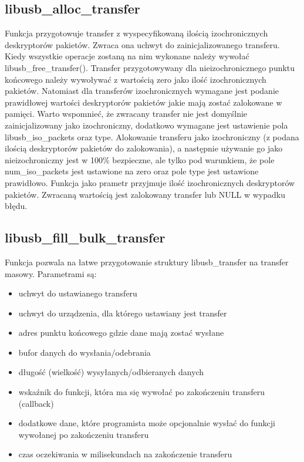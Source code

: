 \documentclass{BscUS}
\begin{document}
\subsection{libusb\_alloc\_transfer}
\noindent Funkcja przygotowuje transfer z wyspecyfikowaną ilością 	izochronicznych deskryptorów pakietów.
Zwraca ona uchwyt do zainicjalizowanego transferu. Kiedy wszystkie operacje zostaną na nim wykonane należy wywołać libusb\_free\_transfer().
Transfer przygotowywany dla nieizochronicznego punktu końcowego należy wywoływać z wartością zero jako ilość izochronicznych pakietów.
Natomiast dla transferów izochronicznych wymagane jest podanie prawidłowej wartości deskryptorów pakietów jakie mają zostać zalokowane w pamięci. Warto wspomnieć, że zwracany transfer nie jest domyślnie zainicjalizowany jako izochroniczny, dodatkowo wymagane jest ustawienie pola libusb\_iso\_packets oraz type.
Alokowanie transferu jako izochroniczny (z podana ilością deskryptorów pakietów do zalokowania), a następnie używanie go jako nieizochroniczny jest w 100\% bezpieczne, ale tylko pod warunkiem, że pole num\_iso\_packets jest ustawione na zero oraz pole type jest ustawione prawidłowo.
Funkcja jako prametr przyjmuje ilość izochronicznych deskryptorów pakietów.
Zwracaną wartością jest zalokowany transfer lub NULL w wypadku błędu.
\subsection{libusb\_fill\_bulk\_transfer}
\noindent Funkcja pozwala na łatwe przygotowanie struktury libusb\_transfer na transfer masowy.
\newline
Parametrami są:
\begin{itemize}
\item uchwyt do ustawianego transferu
\item uchwyt do urządzenia, dla którego ustawiany jest transfer
\item adres punktu końcowego gdzie dane mają zostać wysłane
\item bufor danych do wysłania/odebrania
\item długość (wielkość) wysyłanych/odbieranych danych
\item wskaźnik do funkcji, która ma się wywołać po zakończeniu transferu (callback)
\item dodatkowe dane, które programista może opcjonalnie wysłać do funkcji wywołanej po zakończeniu transferu 
\item czas oczekiwania w milisekundach na zakończenie transferu
\end{itemize}
\end{document}
